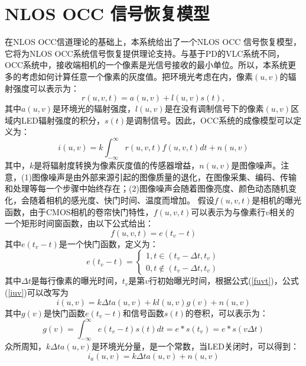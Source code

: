 \section{NLOS OCC 信号恢复模型}
在NLOS OCC信道理论的基础上，本系统给出了一个NLOS OCC 信号恢复模型，它将为NLOS OCC系统信号恢复提供理论支持。与基于PD的VLC系统不同，OCC系统中，接收端相机的一个像素是光信号接收的最小单位。所以，本系统更多的考虑如何计算任意一个像素的灰度值。把环境光考虑在内，像素$(u,v)$的辐射强度可以表示为：
\begin{equation} \label{ruvt}
r(u,v,t) = a(u,v)+l(u,v)s(t),
\end{equation}
其中$a(u, v)$是环境光的辐射强度，$l(u, v)$是在没有调制信号下的像素$(u,v)$区域内LED辐射强度的积分，$s(t)$是调制信号。因此，OCC系统的成像模型可以定义为：
\begin{equation}\label{iuv}
i(u,v) = k\int_{-\infty }^{\infty } r(u,v,t)f(u,v,t)dt+n(u,v)
\end{equation}
其中，$k$是将辐射度转换为像素灰度值的传感器增益，$n(u,v)$是图像噪声。注意，(1)图像噪声是由外部来源引起的图像质量的退化，在图像采集、编码、传输和处理等每一个步骤中始终存在；(2)图像噪声会随着图像亮度、颜色动态随机变化，会随着相机的感光度、快门时间、温度而增加。
假设$f(u,v,t)$是相机的曝光函数，由于CMOS相机的卷帘快门特性，$f(u,v,t)$可以表示为与像素行$v$相关的一个矩形时间窗函数，由以下公式给出：
\begin{equation}\label{fuvt}
f(u,v,t)=e(t_{v}-t)
\end{equation}
其中$e(t_v - t)$是一个快门函数，定义为：
\begin{equation}\label{etv-t}
e(t_{v}-t)=\begin{cases}
   1,t\in(t_{v}-\Delta t, t_{v})\\
  0,t\notin (t_{v}-\Delta t, t_{v})	
\end{cases}
\end{equation}
其中$\Delta t $是每行像素的曝光时间，$t_v$是第$v$行初始曝光时间，根据公式(\ref{fuvt})，公式(\ref{iuv})可以改写为
\begin{equation}\label{iuv+}
i(u,v) = k\Delta ta(u,v)+kl(u,v)g(v)+n(u,v)
\end{equation}
其中$g(v)$是快门函数$e(t_v-t)$和信号函数$s(t)$的卷积，可以表示为：
\begin{equation}\label{gv}
g(v)=\int_{-\infty }^{\infty } e(t_{v}-t)s(t)dt=e*s( t_{v})=e*s( v\Delta t )
\end{equation}
众所周知，$k \Delta t a(u,v)$是环境光分量，是一个常数，当LED关闭时，可以得到：
\begin{equation}\label{iauv}
i_{a}(u,v) = k\Delta t a(u,v)+n(u,v)
\end{equation}
